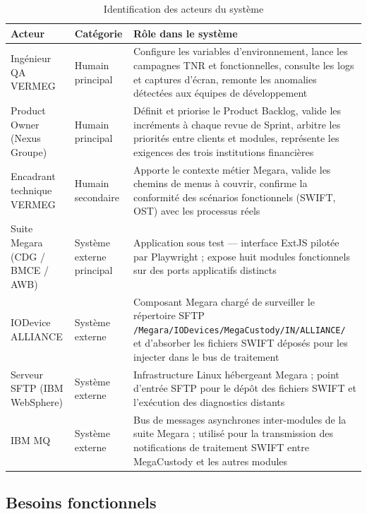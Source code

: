 \documentclass[12pt, a4paper]{report}
\begin{document}
\begin{table}[H]
\centering
\caption{Identification des acteurs du système}
\label{tab:acteurs}
\begin{tabularx}{\textwidth}{p{2.8cm}p{2.4cm}X}
\toprule
\textbf{Acteur} & \textbf{Catégorie} & \textbf{Rôle dans le système} \\
\midrule
Ingénieur QA VERMEG
  & Humain principal
  & Configure les variables d'environnement, lance les campagnes TNR et fonctionnelles, consulte les logs et captures d'écran, remonte les anomalies détectées aux équipes de développement \\[4pt]
Product Owner (Nexus Groupe)
  & Humain principal
  & Définit et priorise le Product Backlog, valide les incréments à chaque revue de Sprint, arbitre les priorités entre clients et modules, représente les exigences des trois institutions financières \\[4pt]
Encadrant technique VERMEG
  & Humain secondaire
  & Apporte le contexte métier Megara, valide les chemins de menus à couvrir, confirme la conformité des scénarios fonctionnels (SWIFT, OST) avec les processus réels \\[4pt]
Suite Megara (CDG / BMCE / AWB)
  & Système externe principal
  & Application sous test — interface ExtJS pilotée par Playwright ; expose huit modules fonctionnels sur des ports applicatifs distincts \\[4pt]
IODevice ALLIANCE
  & Système externe
  & Composant Megara chargé de surveiller le répertoire SFTP \nolinkurl{/Megara/IODevices/MegaCustody/IN/ALLIANCE/} et d'absorber les fichiers SWIFT déposés pour les injecter dans le bus de traitement \\[4pt]
Serveur SFTP (IBM WebSphere)
  & Système externe
  & Infrastructure Linux hébergeant Megara ; point d'entrée SFTP pour le dépôt des fichiers SWIFT et l'exécution des diagnostics distants \\[4pt]
IBM MQ
  & Système externe
  & Bus de messages asynchrones inter-modules de la suite Megara ; utilisé pour la transmission des notifications de traitement SWIFT entre MegaCustody et les autres modules \\
\bottomrule
\end{tabularx}
\end{table}

\subsection{Besoins fonctionnels}
\end{document}
